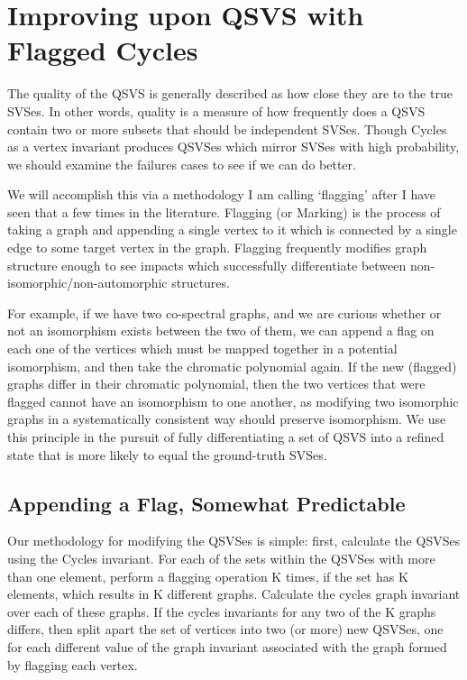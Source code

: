 \section{Improving upon QSVS with Flagged Cycles}

The quality of the QSVS is generally described as how close they are to the true SVSes.
In other words, quality is a measure of how frequently does a QSVS contain two or more subsets that should be independent SVSes.
Though Cycles as a vertex invariant produces QSVSes which mirror SVSes with high probability, we should examine the failures cases to see if we can do better.

We will accomplish this via a methodology I am calling `flagging' after I have seen that a few times in the literature.
Flagging (or Marking) is the process of taking a graph and appending a single vertex to it which is connected by a single edge to some target vertex in the graph.
Flagging frequently modifies graph structure enough to see impacts which successfully differentiate between non-isomorphic/non-automorphic structures.

For example, if we have two co-spectral graphs, and we are curious whether or not an isomorphism exists between the two of them, we can append a flag on each one of the vertices which must be mapped together in a potential isomorphism, and then take the chromatic polynomial again.
If the new (flagged) graphs differ in their chromatic polynomial, then the two vertices that were flagged cannot have an isomorphism to one another, as modifying two isomorphic graphs in a systematically consistent way should preserve isomorphism.
We use this principle in the pursuit of fully differentiating a set of QSVS into a refined state that is more likely to equal the ground-truth SVSes.

\subsection{Appending a Flag, Somewhat Predictable}

Our methodology for modifying the QSVSes is simple: first, calculate the QSVSes using the Cycles invariant.
For each of the sets within the QSVSes with more than one element, perform a flagging operation K times, if the set has K elements, which results in K different graphs.
Calculate the cycles graph invariant over each of these graphs.
If the cycles invariants for any two of the K graphs differs, then split apart the set of vertices into two (or more) new QSVSes, one for each different value of the graph invariant associated with the graph formed by flagging each vertex.


